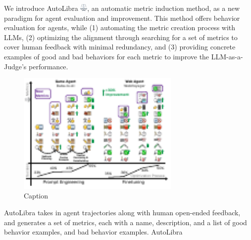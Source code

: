 We introduce AutoLibra \protect\includegraphics[height=1em]{figs/scale.png}, an automatic metric induction method,
as a new paradigm for agent evaluation and improvement.
This method offers behavior evaluation for agents, while (1) automating the metric creation process with LLMs, 
(2) optimizing the alignment through searching for a set of metrics to cover human feedback with minimal redundancy,
and (3) providing concrete examples of good and bad behaviors for each metric to improve the
LLM-as-a-Judge's performance. 
\begin{figure}
    \centering
    \includegraphics[width=0.7\textwidth]{figs/autolibra-teaser.pdf}
    \caption{Caption}
    \label{fig:enter-label}
\end{figure}

AutoLibra takes in agent trajectories along with human open-ended feedback, and generates a set of metrics, each with a name, description, and a list of good behavior examples, and bad behavior examples. AutoLibra 



